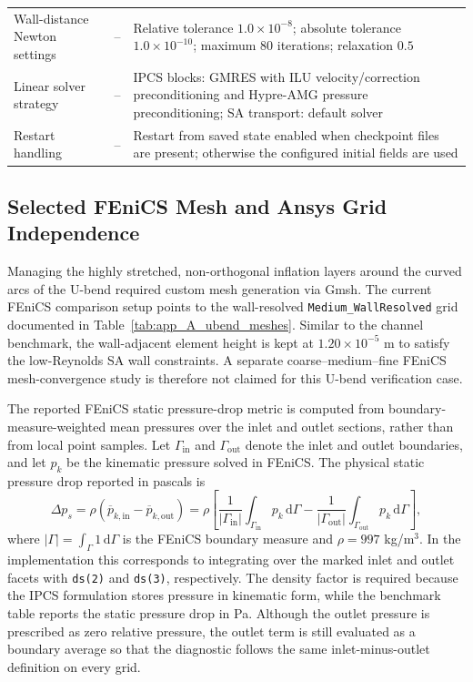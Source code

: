 \begin{table}[htbp]
\begin{tabularx}{\textwidth}{l c X}
			Wall-distance Newton settings & -- & Relative tolerance $1.0 \times 10^{-8}$; absolute tolerance $1.0 \times 10^{-10}$; maximum $80$ iterations; relaxation $0.5$ \\
			Linear solver strategy & -- & IPCS blocks: GMRES with ILU velocity/correction preconditioning and Hypre-AMG pressure preconditioning; SA transport: default solver \\
			Restart handling & -- & Restart from saved state enabled when checkpoint files are present; otherwise the configured initial fields are used \\
		\hline
	\end{tabularx}
\end{table}

\subsection{Selected FEniCS Mesh and Ansys Grid Independence}
\label{subsec:app_A_ubend_mesh}
	Managing the highly stretched, non-orthogonal inflation layers around the curved arcs of the U-bend required custom mesh generation via Gmsh. The current FEniCS comparison setup points to the wall-resolved \texttt{Medium\_WallResolved} grid documented in Table~\ref{tab:app_A_ubend_meshes}. Similar to the channel benchmark, the wall-adjacent element height is kept at $1.20 \times 10^{-5}$ m to satisfy the low-Reynolds SA wall constraints. A separate coarse--medium--fine FEniCS mesh-convergence study is therefore not claimed for this U-bend verification case.

The reported FEniCS static pressure-drop metric is computed from boundary-measure-weighted mean pressures over the inlet and outlet sections, rather than from local point samples. Let $\Gamma_{\mathrm{in}}$ and $\Gamma_{\mathrm{out}}$ denote the inlet and outlet boundaries, and let $p_k$ be the kinematic pressure solved in FEniCS. The physical static pressure drop reported in pascals is
\begin{equation}
	\Delta p_s
	= \rho\left(\overline{p}_{k,\mathrm{in}}-\overline{p}_{k,\mathrm{out}}\right)
	= \rho\left[
	\frac{1}{|\Gamma_{\mathrm{in}}|}\int_{\Gamma_{\mathrm{in}}} p_k \, \mathrm{d}\Gamma
	-
	\frac{1}{|\Gamma_{\mathrm{out}}|}\int_{\Gamma_{\mathrm{out}}} p_k \, \mathrm{d}\Gamma
	\right],
	\label{eq:app_A_ubend_fenics_delta_p}
\end{equation}
where $|\Gamma|=\int_{\Gamma}1\,\mathrm{d}\Gamma$ is the FEniCS boundary measure and $\rho=997$ kg/m$^3$. In the implementation this corresponds to integrating over the marked inlet and outlet facets with \texttt{ds(2)} and \texttt{ds(3)}, respectively. The density factor is required because the IPCS formulation stores pressure in kinematic form, while the benchmark table reports the static pressure drop in Pa. Although the outlet pressure is prescribed as zero relative pressure, the outlet term is still evaluated as a boundary average so that the diagnostic follows the same inlet-minus-outlet definition on every grid.

